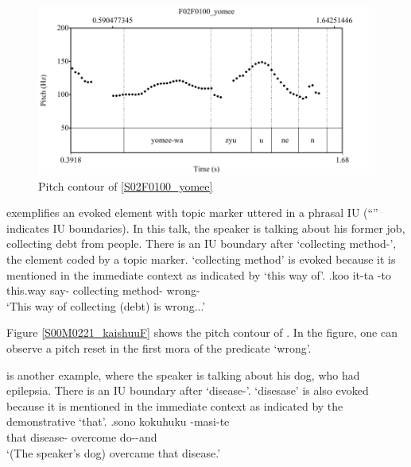 \begin{figure}
	\begin{center}
	\includegraphics[width=.5\textwidth]{sounds/s02F0100_yomee.pdf}
	\caption{Pitch contour of \ref{S02F0100_yomee}}
	\label{S02F0100_yomeeF}
	\end{center}
\end{figure}

\Next exemplifies an evoked element with topic marker
uttered in a phrasal IU
(``\tp{\dvline}'' indicates IU boundaries).
In this talk, the speaker is talking about his former job,
collecting debt from people.
There is an IU boundary after  `collecting method-', the element coded by a topic marker.
 `collecting method' is evoked because
it is mentioned in the immediate context
as indicated by  `this way of'.
%
\exg.\label{S00M0221_kaishuu}koo it-ta \tp{\dvline}   \tp{\dvline} -to \tp{\dvline} \\
	this.way say- {} collecting method- {} wrong- {} \\
	`This way of collecting (debt) is wrong...'

Figure \ref{S00M0221_kaishuuF} shows the pitch contour of \Last.
In the figure,
one can observe a pitch reset in the first mora of the predicate  `wrong'.

\Next is another example,
where the speaker is talking about his dog,
who had epilepsia.
There is an IU boundary after  `disease-'.
 `disesase' is also evoked because it is mentioned in the immediate context
as indicated by the demonstrative  `that'.
%
\exg.\label{S02M0198_tenkan}sono  \tp{\dvline} {kokuhuku} -masi-te \tp{\dvline} \\
		that disease- {} overcome do--and {} \\
		`(The speaker's dog) overcame that disease.'

